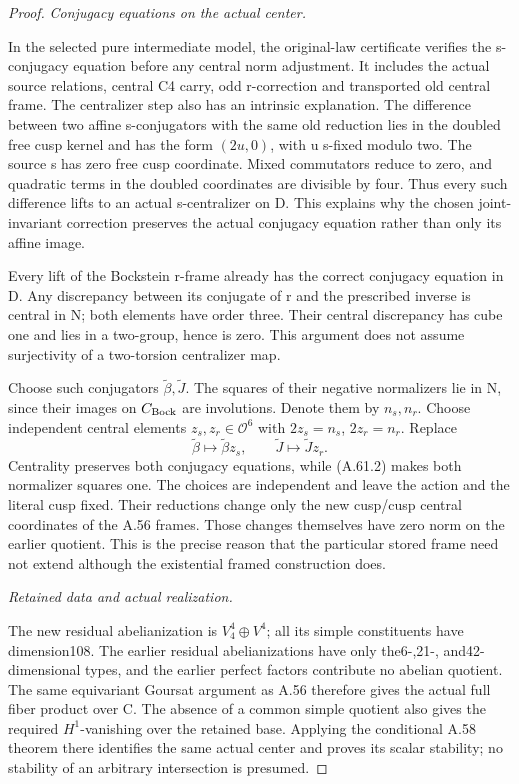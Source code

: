 \begin{proof}
\emph{Conjugacy equations on the actual center.}\par
In the selected pure intermediate model, the original-law
certificate  verifies the
s-conjugacy equation before any central norm adjustment.
It includes the actual source relations, central C4 carry,
odd r-correction and transported old central frame. The
centralizer step also has an intrinsic explanation. The
difference between two affine s-conjugators with the same
old reduction lies in the doubled free cusp kernel and has
the form \((2u,0)\), with u s-fixed modulo two. The source s
has zero free cusp coordinate. Mixed commutators reduce to
zero, and quadratic terms in the doubled coordinates are
divisible by four. Thus every such difference lifts to an
actual s-centralizer on D. This explains why the chosen
joint-invariant correction preserves the actual conjugacy
equation rather than only its affine image.

Every lift of the Bockstein r-frame already has the correct
conjugacy equation in D. Any discrepancy between its conjugate
of r and the prescribed inverse is central in N; both elements
have order three. Their central discrepancy has cube one and
lies in a two-group, hence is zero. This argument does not
assume surjectivity of a two-torsion centralizer map.

Choose such conjugators \(\widetilde\beta,\widetilde J\).
The squares of their negative normalizers lie in N, since
their images on \(C_{\rm Bock}\) are involutions. Denote them
by \(n_s,n_r\). Choose independent central elements
\(z_s,z_r\in\mathcal O^6\) with
\(2z_s=n_s\), \(2z_r=n_r\). Replace
\[
 \widetilde\beta\longmapsto\widetilde\beta z_s,
 \qquad \widetilde J\longmapsto\widetilde J z_r.
 \tag{A.61.5}
\]
Centrality preserves both conjugacy equations, while
(A.61.2) makes both normalizer squares one. The choices are
independent and leave the action and the literal cusp fixed.
Their reductions change only the new cusp/cusp central
coordinates of the A.56 frames. Those changes themselves have
zero norm on the earlier quotient. This is the precise reason
that the particular stored frame need not extend although
the existential framed construction does.

\emph{Retained data and actual realization.}\par
The new residual abelianization is
\(V_4^4\oplus V^4\); all its simple constituents have
dimension108. The earlier residual abelianizations have only
the6-,21-, and42-dimensional types, and the earlier perfect
factors contribute no abelian quotient. The same equivariant
Goursat argument as A.56 therefore gives the actual full fiber
product over C. The absence of a common simple quotient also
gives the required \(H^1\)-vanishing over the retained base.
Applying the conditional A.58 theorem there identifies the
same actual center and proves its scalar stability; no
stability of an arbitrary intersection is presumed.


\end{proof}
